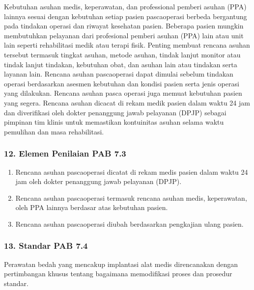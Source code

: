 \documentclass[
]{book}
\providecommand{\tightlist}{%
  \setlength{\itemsep}{0pt}\setlength{\parskip}{0pt}}
\begin{document}
Kebutuhan asuhan medis, keperawatan, dan professional pemberi asuhan (PPA) lainnya sesuai dengan kebutuhan setiap pasien pascaoperasi berbeda bergantung pada tindakan operasi dan riwayat kesehatan pasien. Beberapa pasien mungkin membutuhkan pelayanan dari profesional pemberi asuhan (PPA) lain atau unit lain seperti rehabilitasi medik atau terapi fisik. Penting membuat rencana asuhan tersebut termasuk tingkat asuhan, metode asuhan, tindak lanjut monitor atau tindak lanjut tindakan, kebutuhan obat, dan asuhan lain atau tindakan serta layanan lain. Rencana asuhan pascaoperasi dapat dimulai sebelum tindakan operasi berdasarkan asesmen kebutuhan dan kondisi pasien serta jenis operasi yang dilakukan.
Rencana asuhan pasca operasi juga memuat kebutuhan pasien yang segera. Rencana asuhan dicacat di rekam medik pasien dalam waktu 24 jam dan diverifikasi oleh dokter penanggung jawab pelayanan (DPJP) sebagai pimpinan tim klinis untuk memastikan kontuinitas asuhan selama waktu pemulihan dan masa rehabilitasi.

\hypertarget{elemen-penilaian-pab-7.3}{%
\subsubsection*{12. Elemen Penilaian PAB 7.3}\label{elemen-penilaian-pab-7.3}}

\begin{enumerate}
\def\labelenumi{\alph{enumi}.}
\tightlist
\item
  Rencana asuhan pascaoperasi dicatat di rekam medis pasien dalam waktu 24 jam oleh dokter penanggung jawab pelayanan (DPJP).
\item
  Rencana asuhan pascaoperasi termasuk rencana asuhan medis, keperawatan, oleh PPA lainnya berdasar atas kebutuhan pasien.
\item
  Rencana asuhan pascaoperasi diubah berdasarkan pengkajian ulang pasien.
\end{enumerate}

\hypertarget{standar-pab-7.4}{%
\subsubsection*{13. Standar PAB 7.4}\label{standar-pab-7.4}}

Perawatan bedah yang mencakup implantasi alat medis direncanakan dengan pertimbangan khusus tentang bagaimana memodifikasi proses dan prosedur standar.
\end{document}
